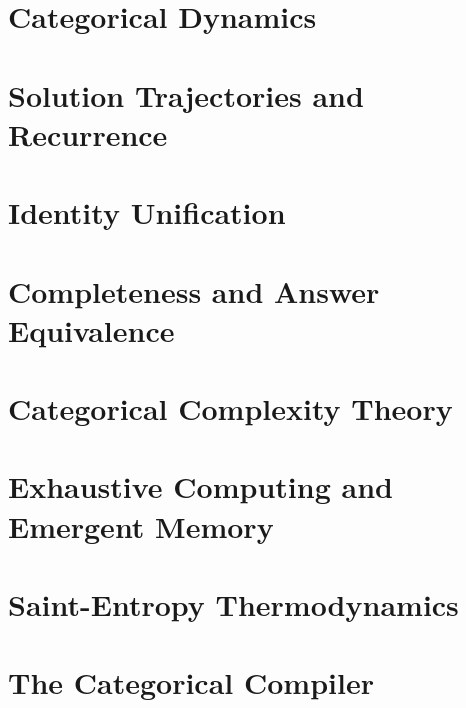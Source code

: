 \documentclass[twocolumn,10pt]{article}
\theoremstyle{plain}
\theoremstyle{definition}
\theoremstyle{remark}
\begin{document}


\section{Categorical Dynamics}
\label{sec:categorical_dynamics}



\section{Solution Trajectories and Recurrence}
\label{sec:solution_trajectory}



\section{Identity Unification}
\label{sec:identity_unification}



\section{Completeness and Answer Equivalence}
\label{sec:completeness}



\section{Categorical Complexity Theory}
\label{sec:complexity}



\section{Exhaustive Computing and Emergent Memory}
\label{sec:exhaustive}



\section{Saint-Entropy Thermodynamics}
\label{sec:stellas}



\section{The Categorical Compiler}
\label{sec:compiler}
\end{document}
